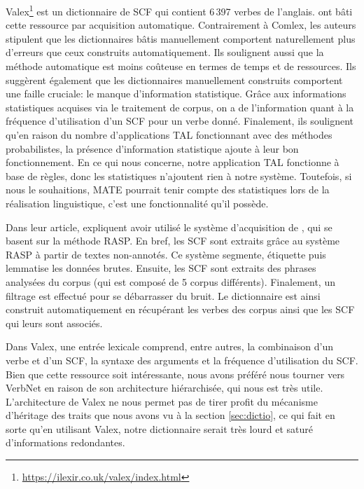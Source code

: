 Valex\footnote{\url{https://ilexir.co.uk/valex/index.html}} \citep{Korhonenlargesubcategorizationlexicon2006}  est un dictionnaire de \ac{SCF} qui contient 6\,397 verbes de l'anglais. \citeauthor{Korhonenlargesubcategorizationlexicon2006} ont bâti cette ressource par acquisition automatique. Contrairement à Comlex, les auteurs stipulent que les dictionnaires bâtis manuellement comportent naturellement plus d'erreurs que ceux construits automatiquement. Ils soulignent aussi que la méthode automatique est moins coûteuse en termes de temps et de ressources. Ils suggèrent également que les dictionnaires manuellement construits comportent une faille cruciale: le manque d'information statistique. Grâce aux informations statistiques acquises via le traitement de corpus, on a de l'information quant à la fréquence d'utilisation d'un \ac{SCF} pour un verbe donné. Finalement, ils soulignent qu'en raison du nombre d'applications \ac{TAL} fonctionnant avec des méthodes probabilistes, la présence d'information statistique ajoute à leur bon fonctionnement. En ce qui nous concerne, notre application \ac{TAL} fonctionne à base de règles, donc les statistiques n'ajoutent rien à notre système. Toutefois, si nous le souhaitions, MATE \citep{BohnetDevelopmentEnvironmentMTTbased2000a,BOHNET10,bohnet07} pourrait tenir compte des statistiques lors de la réalisation linguistique, c'est une fonctionnalité qu'il possède.

Dans leur article, \citeauthor{Korhonenlargesubcategorizationlexicon2006} expliquent avoir utilisé le système d'acquisition de \cite{BriscoeSecondReleaseRASP2006}, qui se basent sur la méthode RASP. En bref, les \ac{SCF} sont extraits grâce au système RASP à partir de textes non-annotés. Ce système segmente, étiquette puis lemmatise les données brutes. Ensuite, les \ac{SCF} sont extraits des phrases analysées du corpus (qui est composé de 5 corpus différents). Finalement, un filtrage est effectué pour se débarrasser du bruit. Le dictionnaire est ainsi construit automatiquement en récupérant les verbes des corpus ainsi que les \ac{SCF} qui leurs sont associés.

Dans Valex, une entrée lexicale comprend, entre autres, la combinaison d'un verbe et d'un SCF, la syntaxe des arguments et la fréquence d'utilisation du SCF. Bien que cette ressource soit intéressante, nous avons préféré nous tourner vers VerbNet en raison de son architecture hiérarchisée, qui nous est très utile. L'architecture de Valex ne nous permet pas de tirer profit du mécanisme d'héritage des traits que nous avons vu à la section \ref{sec:dictio}, ce qui fait en sorte qu'en utilisant Valex, notre dictionnaire serait très lourd et saturé d'informations redondantes.

